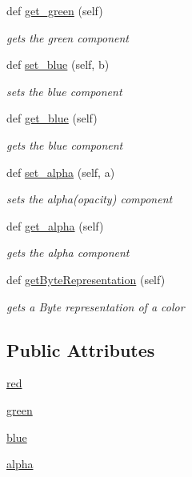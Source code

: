 \begin{DoxyCompactItemize}
def \hyperlink{class_bridges_1_1_color_1_1_color_adf7fc94b1b5887936da71b361ead3e51}{get\+\_\+green} (self)
\begin{DoxyCompactList}\small\item\em gets the green component \end{DoxyCompactList}\item 
def \hyperlink{class_bridges_1_1_color_1_1_color_a5b298c7b23b82e2599377ec79f199362}{set\+\_\+blue} (self, b)
\begin{DoxyCompactList}\small\item\em sets the blue component \end{DoxyCompactList}\item 
def \hyperlink{class_bridges_1_1_color_1_1_color_abdcf7f0ca2f7288e58dad6f7ea5b9824}{get\+\_\+blue} (self)
\begin{DoxyCompactList}\small\item\em gets the blue component \end{DoxyCompactList}\item 
def \hyperlink{class_bridges_1_1_color_1_1_color_a3dbced3824a73df14c8bf810d445238e}{set\+\_\+alpha} (self, a)
\begin{DoxyCompactList}\small\item\em sets the alpha(opacity) component \end{DoxyCompactList}\item 
def \hyperlink{class_bridges_1_1_color_1_1_color_aee2ff0c486cfd6d4f3261b79bafeb2d5}{get\+\_\+alpha} (self)
\begin{DoxyCompactList}\small\item\em gets the alpha component \end{DoxyCompactList}\item 
def \hyperlink{class_bridges_1_1_color_1_1_color_a13edd205c32eb199664b87f0145f50fe}{get\+Byte\+Representation} (self)
\begin{DoxyCompactList}\small\item\em gets a Byte representation of a color \end{DoxyCompactList}\end{DoxyCompactItemize}
\subsection*{Public Attributes}
\begin{DoxyCompactItemize}
\item 
\hyperlink{class_bridges_1_1_color_1_1_color_a51436cc5661d40acb09332e7bc9a13b7}{red}
\item 
\hyperlink{class_bridges_1_1_color_1_1_color_a28cfec830c2711349e63446c639467b2}{green}
\item 
\hyperlink{class_bridges_1_1_color_1_1_color_afc4245f86380876a9014a55c6fae4dab}{blue}
\item 
\hyperlink{class_bridges_1_1_color_1_1_color_afc73e1d4c91bceaa293dc2525fe51a84}{alpha}
\end{DoxyCompactItemize}
